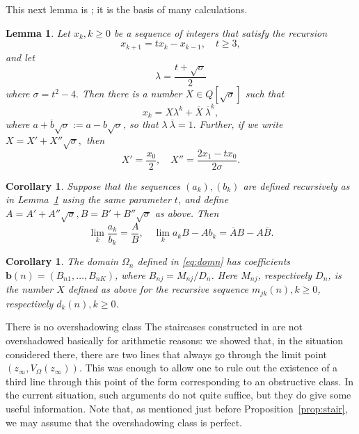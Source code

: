 \documentclass[11pt, reqno]{amsart}
\makeatletter
\def\subsection{\@startsection{subsection}{2}%
  \z@{.75\linespacing\@plus.7\linespacing}{-.5em}%
  {\normalfont\large\bfseries}}
\newtheorem{lemma}[thm]{Lemma}
\newtheorem{cor}[thm]{Corollary}
\theoremstyle{remark}
\numberwithin{equation}{subsection}
\numberwithin{figure}{section}
\theoremstyle{customremark}
\newcommand{\ov}{\overline}
\newcommand{\Om}{{\Omega}}
\newcommand{\la}{{\lambda}}
\newcommand{\si}{{\sigma}}
\makeatother
\begin{document}
This next lemma is  \cite[Lemma 3.1.4]{MM}; it is the basis of many calculations.
\begin{lemma} \label{lem:recur1}
    Let $x_k,k \geq 0$ be a sequence of integers that satisfy the recursion
    \[ x_{k+1}=t x_k-x_{k-1}, \quad t \geq 3,\]
    and let 
    \[ \la=\frac{t+\sqrt{\si}}{2}\] where $\si=t^2-4.$ Then there is a number $X \in Q[\sqrt{\si}]$ such that 
    \begin{equation} \label{eq:recurSln}
         x_k=X\la^k+\ov{X}\ \ov{\la}^k,
    \end{equation}
    where $\ov{a+b\sqrt{\si}}:=a-b\sqrt{\si}$, so that $\la \ \ov{\la}=1.$ Further, if we write $X=X'+X''\sqrt{\si},$ then
    \begin{equation} \label{eq:bigX}
        X'=\frac{x_0}{2}, \quad X''=\frac{2x_1-tx_0}{2\si}.
    \end{equation}
\end{lemma}


\begin{cor}\label{cor:dom0} Suppose that  the  sequences $(a_k), (b_k)$  are defined recursively as in Lemma~\ref{lem:recur1} using the same parameter $t$, and define $A =A'+A''\sqrt{\si}, B = B'+B''\sqrt{\si}$ as above. Then 
$$
\lim_k\frac{a_k}{b_k} = \frac AB, \quad \lim_k a_kB - A b_k = \ov A B - A\ov B.
$$
\end{cor}

\begin{cor}\label{cor:dom}  The domain $\Om_n$ defined in \eqref{eq:domn} has coefficients $\bm{b}(n) = (B_{n1},\dots,B_{nK})$,
where $B_{nj} = M_{nj}/D_n$. Here $M_{nj}$, respectively $D_n$, is the number $X$ defined as above for the recursive sequence $m_{jk}(n), k\ge 0$, respectively $d_{k}(n), k\ge 0$.
\end{cor}



\subsection{There is no overshadowing class}\label{ss:oversh}
The staircases constructed in \cite{MMW} are not overshadowed basically for arithmetic reasons:
we showed that, in the  situation  considered there, there are  two lines that always go through the limit point
$(z_\infty, V_\Om(z_\infty))$. This was enough to allow one to rule out the existence of a third line through this point of the form corresponding to an obstructive class.  In the current situation, such  arguments do not quite suffice, but they do give some useful information. Note that, as mentioned just before Proposition~\ref{prop:stair}, we may assume that the overshadowing class is perfect.
\end{document}
